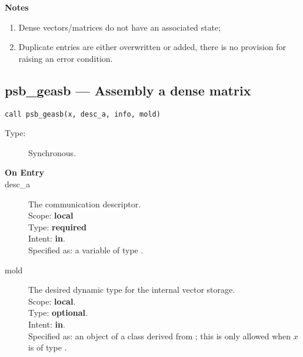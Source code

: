 {\par\noindent\large\bfseries Notes}
\begin{enumerate}
\item Dense vectors/matrices do not have an associated state;
\item Duplicate entries are either overwritten or added, there is no
  provision for raising an error condition. 
\end{enumerate}


%
%
\clearpage\subsection{psb\_geasb --- Assembly a dense matrix}

\begin{verbatim}
call psb_geasb(x, desc_a, info, mold)
\end{verbatim}

\begin{description}
\item[Type:] Synchronous.
\item[\bf On Entry]
\item[desc\_a] The communication descriptor.\\
Scope: {\bf local} \\
Type: {\bf required}\\
Intent: {\bf in}.\\
Specified as: a variable of type \descdata.\\
\item[mold] The desired dynamic type for the internal vector storage.\\
Scope: {\bf local}.\\
Type: {\bf optional}.\\
Intent: {\bf in}.\\
Specified as: an object of a class derived from \vbasedata; this is
only allowed when $x$ is of type \vdata.
\end{description}

